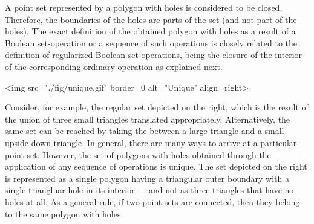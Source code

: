 A point set represented by a polygon with holes is considered to be
closed. Therefore, the boundaries of the holes are parts of the set
(and not part of the holes).
The exact definition of the obtained polygon with holes as a result of
a Boolean set-operation or a sequence of such operations is closely
related to the definition of regularized Boolean set-operations, being
the closure of the interior of the corresponding ordinary operation as
explained next.
\newpage
\lcTex{%
  \setlength{\BooleanSetOpsWidthRight}{1.4cm}
  \setlength{\BooleanSetOpsWidthLeft}{\BooleanSetOpsWidthLineReal}
  \addtolength{\BooleanSetOpsWidthLeft}{-\BooleanSetOpsWidthRight}
  \begin{minipage}{\BooleanSetOpsWidthLeft}
}
\label{fig:unique}
\begin{ccHtmlOnly}
  <img src="./fig/unique.gif" border=0 alt="Unique" align=right>
\end{ccHtmlOnly}
Consider, for example, the regular set depicted on the right, which is
the result of the union of three small triangles translated
appropriately. Alternatively, the same set can be reached by taking
the  between a large triangle and a small
upside-down triangle. In general, there are many ways to arrive at 
a particular point set. However, the set of polygons with holes
obtained through the application of any sequence of operations is
unique. The set depicted on the right is represented as a single
polygon having a triangular outer boundary with a single triangluar
hole in its interior --- and not as three triangles that have no holes
at all. As a general rule, if two point sets are connected, then they
belong to the same polygon with holes.

